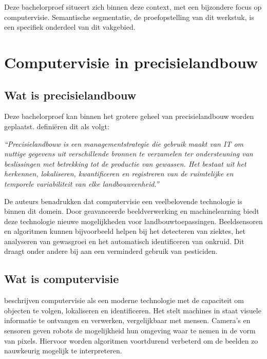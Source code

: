 Deze bachelorproef situeert zich binnen deze context, met een bijzondere focus op computervisie. Semantische segmentatie, de proefopstelling van dit werkstuk, is een specifiek onderdeel van dit vakgebied.

\section{Computervisie in precisielandbouw}
\subsection{Wat is precisielandbouw}
Deze bachelorproef kan binnen het grotere geheel van precisielandbouw worden geplaatst. \textcite{Cisternas2020} definiëren dit als volgt: 

\begin{tcolorbox}[colback=gray!5, colframe=white, sharp corners, boxrule=0pt, width=\linewidth]
    \textit{“Precisielandbouw is een managementstrategie die gebruik maakt van IT om nuttige gegevens uit verschillende bronnen te verzamelen ter ondersteuning van beslissingen met betrekking tot de productie van gewassen. Het bestaat uit het herkennen, lokaliseren, kwantificeren en registreren van de ruimtelijke en temporele variabiliteit van elke landbouweenheid.”} 
\end{tcolorbox}

De auteurs benadrukken dat computervisie een veelbelovende technologie is binnen dit domein. Door geavanceerde beeldverwerking en machinelearning biedt deze technologie nieuwe mogelijkheden voor landbouwtoepassingen. Beeldsensoren en algoritmen kunnen bijvoorbeeld helpen bij het detecteren van ziektes, het analyseren van gewasgroei en het automatisch identificeren van onkruid. Dit draagt onder andere bij aan een verminderd gebruik van pesticiden.

\subsection{Wat is computervisie}
\textcite{Radojcic2023} beschrijven computervisie als een moderne technologie met de capaciteit om objecten te volgen, lokaliseren en identificeren. Het stelt machines in staat visuele informatie te ontvangen en verwerken, vergelijkbaar met mensen. Camera’s en sensoren geven robots de mogelijkheid hun omgeving waar te nemen in de vorm van pixels. Hiervoor worden algoritmen voortdurend verbeterd om de beelden zo nauwkeurig mogelijk te interpreteren. 

